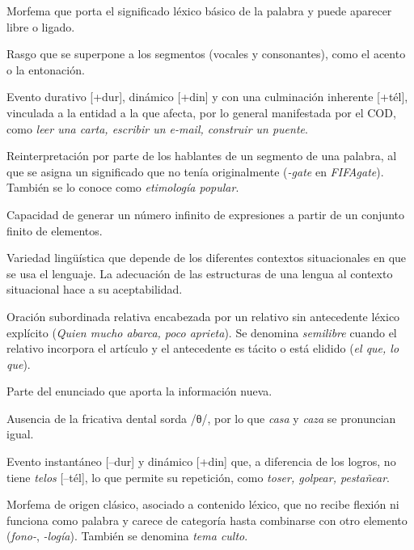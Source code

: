 \begin{glosariogeneral}
  \item[Raíz:] Morfema que porta el significado léxico básico de la palabra y
        puede aparecer libre o ligado.
  \item[Rasgo suprasegmental:] Rasgo que se superpone a los segmentos (vocales y
        consonantes), como el acento o la entonación.
  \item[Realización:] Evento durativo [+dur], dinámico [+din] y con una
        culminación inherente [+tél], vinculada a la entidad a la que afecta,
        por lo general manifestada por el COD, como \textit{leer una carta,
        escribir un e-mail, construir un puente}.
  \item[Reanálisis:] Reinterpretación por parte de los hablantes de un
        segmento de una palabra, al que se asigna un significado que no tenía
        originalmente (\textit{-gate} en \textit{FIFAgate}). También se lo
        conoce como \textit{etimología popular}.
  \item[Recursividad:] Capacidad de generar un número infinito de expresiones a
        partir de un conjunto finito de elementos.
  \item[Registro:] Variedad lingüística que depende de los diferentes contextos
        situacionales en que se usa el lenguaje. La adecuación de las
        estructuras de una lengua al contexto situacional hace a su
        aceptabilidad.
  \item[Relativa libre:] Oración subordinada relativa encabezada por un relativo
        sin antecedente léxico explícito (\textit{Quien mucho abarca, poco
        aprieta}). Se denomina \textit{semilibre} cuando el relativo incorpora el
        artículo y el antecedente es tácito o está elidido (\textit{el que, lo
        que}).
  \item[Rema:] Parte del enunciado que aporta la información nueva.
  \item[Seseo:] Ausencia de la fricativa dental sorda /θ/, por lo que
        \textit{casa} y \textit{caza} se pronuncian igual.
  \item[Semelfactivo:] Evento instantáneo [--dur] y dinámico [+din] que, a
        diferencia de los logros, no tiene \textit{telos} [--tél], lo que
        permite su repetición, como \textit{toser, golpear, pestañear}.
  \item[Semipalabra:] Morfema de origen clásico, asociado a contenido léxico,
        que no recibe flexión ni funciona como palabra y carece de categoría
        hasta combinarse con otro elemento (\textit{fono-}, \textit{-logía}).
        También se denomina \textit{tema culto}.

\end{glosariogeneral}

